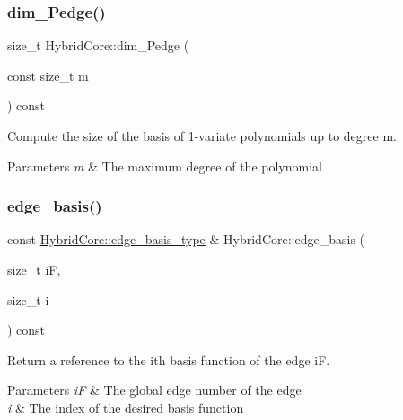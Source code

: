 \subsubsection{\texorpdfstring{dim\+\_\+\+Pedge()}{dim\_Pedge()}}
{\footnotesize\ttfamily size\+\_\+t Hybrid\+Core\+::dim\+\_\+\+Pedge (\begin{DoxyParamCaption}\item[{const size\+\_\+t}]{m }\end{DoxyParamCaption}) const}



Compute the size of the basis of 1-\/variate polynomials up to degree m. 


\begin{DoxyParams}{Parameters}
{\em m} & The maximum degree of the polynomial \\
\hline
\end{DoxyParams}
\mbox{\label{classHArDCore2D_1_1HybridCore_a6b4feaeef7739a2e30fcf6c601fcf721}} 
\subsubsection{\texorpdfstring{edge\+\_\+basis()}{edge\_basis()}}
{\footnotesize\ttfamily const \hyperlink{classHArDCore2D_1_1HybridCore_a1f2030ea16722179fd3523e6e6675948}{Hybrid\+Core\+::edge\+\_\+basis\+\_\+type} \& Hybrid\+Core\+::edge\+\_\+basis (\begin{DoxyParamCaption}\item[{size\+\_\+t}]{iF,  }\item[{size\+\_\+t}]{i }\end{DoxyParamCaption}) const}



Return a reference to the i\textquotesingle{}th basis function of the edge iF. 


\begin{DoxyParams}{Parameters}
{\em iF} & The global edge number of the edge \\
\hline
{\em i} & The index of the desired basis function \\
\hline
\end{DoxyParams}
\mbox{\label{classHArDCore2D_1_1HybridCore_a448297d0d0afefe477815dfb7821b270}} 
